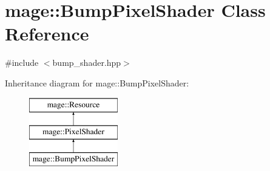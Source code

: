 \hypertarget{classmage_1_1_bump_pixel_shader}{}\section{mage\+:\+:Bump\+Pixel\+Shader Class Reference}
\label{classmage_1_1_bump_pixel_shader}


{\ttfamily \#include $<$bump\+\_\+shader.\+hpp$>$}

Inheritance diagram for mage\+:\+:Bump\+Pixel\+Shader\+:\begin{figure}[H]
\begin{center}
\leavevmode
\includegraphics[height=3.000000cm]{classmage_1_1_bump_pixel_shader}
\end{center}
\end{figure}
